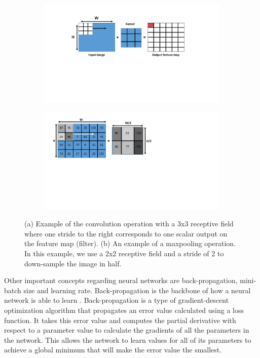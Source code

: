 \documentclass{osa-article}
\begin{document}
\begin{figure}[!ht]
\centering
\begin{subfigure}[b]{0.5\textwidth}
   \includegraphics[width=1\linewidth]{convolution}
   \caption{}
   \label{conv} 
\end{subfigure}\hfill
\begin{subfigure}[b]{0.45\textwidth}
   \includegraphics[width=1\linewidth]{maxpool}
   \caption{}
   \label{pool}
\end{subfigure}
\caption{(a) Example of the convolution operation with a 3x3 receptive field where one stride to the right corresponds to one scalar output on the feature map (filter). (b) An example of a maxpooling operation. In this example, we use a 2x2 receptive field and a stride of 2 to down-sample the image in half.}\label{conv_max_operations}
\end{figure}
Other important concepts regarding neural networks are back-propagation, mini-batch size and learning rate. Back-propagation is the backbone of how a neural network is able to learn \cite{Rumelhart:1988:LRB:65669.104451}. Back-propagation is a type of gradient-descent optimization algorithm that propagates an error value calculated using a loss function. It takes this error value and computes the partial derivative with respect to a parameter value to calculate the gradients of all the parameters in the network. This allows the network to learn values for all of its parameters to achieve a global minimum that will make the error value the smallest. \par
\end{document}
